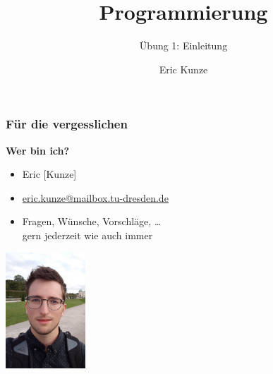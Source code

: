 \documentclass{beamer}
\begin{document}
	
	\title{Programmierung}
	\subtitle{Übung 1: Einleitung}
	\author{Eric Kunze}

	\maketitle
	
	\begin{frame} \frametitle{Für die vergesslichen}
		\begin{minipage}{\dimexpr0.75\linewidth-\fboxrule-\fboxsep}
			\textbf{Wer bin ich?}
			\begin{itemize}
				\item Eric [Kunze]
				\item \url{eric.kunze@mailbox.tu-dresden.de}
				\item Fragen, Wünsche, Vorschläge, \dots \\ gern jederzeit wie auch immer
			\end{itemize}
		\end{minipage}
		\begin{minipage}{\dimexpr0.25\linewidth-\fboxrule-\fboxsep}
			\includegraphics[width=3cm]{./tut01_pic.jpg}
		\end{minipage}
	\end{frame}
\end{document}
